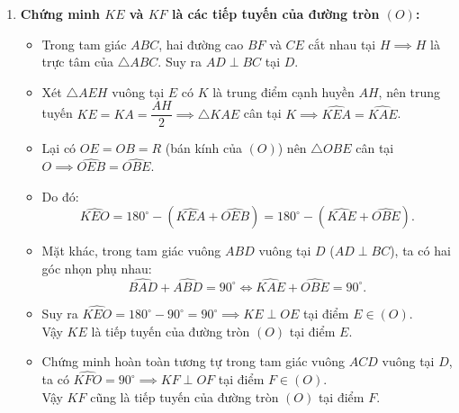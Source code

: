 \begin{ex}
{\begin{enumerate}[label=\textbf{\alph*)}]
    \item \textbf{Chứng minh $KE$ và $KF$ là các tiếp tuyến của đường tròn $(O)$:}
    \begin{itemize}
        \item Trong tam giác $ABC$, hai đường cao $BF$ và $CE$ cắt nhau tại $H \implies H$ là trực tâm của $\triangle ABC$. Suy ra $AD \perp BC$ tại $D$.
        \item Xét $\triangle AEH$ vuông tại $E$ có $K$ là trung điểm cạnh huyền $AH$, nên trung tuyến $KE = KA = \dfrac{AH}{2} \implies \triangle KAE$ cân tại $K \implies \widehat{KEA} = \widehat{KAE}$.
        \item Lại có $OE = OB = R$ (bán kính của $(O)$) nên $\triangle OBE$ cân tại $O \implies \widehat{OEB} = \widehat{OBE}$.
        \item Do đó:
        \[
        \widehat{KEO} = 180^\circ - (\widehat{KEA} + \widehat{OEB}) = 180^\circ - (\widehat{KAE} + \widehat{OBE}).
        \]
        \item Mặt khác, trong tam giác vuông $ABD$ vuông tại $D$ ($AD \perp BC$), ta có hai góc nhọn phụ nhau:
        \[
        \widehat{BAD} + \widehat{ABD} = 90^\circ \iff \widehat{KAE} + \widehat{OBE} = 90^\circ.
        \]
        \item Suy ra $\widehat{KEO} = 180^\circ - 90^\circ = 90^\circ \implies KE \perp OE$ tại điểm $E \in (O)$.\\
        Vậy $KE$ là tiếp tuyến của đường tròn $(O)$ tại điểm $E$.
        \item Chứng minh hoàn toàn tương tự trong tam giác vuông $ACD$ vuông tại $D$, ta có $\widehat{KFO} = 90^\circ \implies KF \perp OF$ tại điểm $F \in (O)$.\\
        Vậy $KF$ cũng là tiếp tuyến của đường tròn $(O)$ tại điểm $F$.
    \end{itemize}


\end{enumerate}}
\end{ex}
